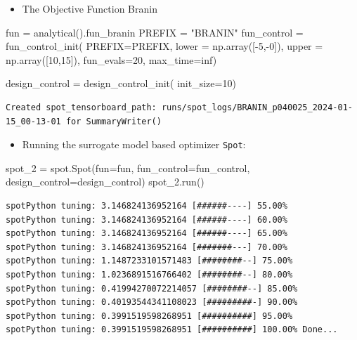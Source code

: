 \documentclass[
  letterpaper,
  DIV=11,
  numbers=noendperiod]{scrreprt}
\newenvironment{Shaded}{\begin{snugshade}}{\end{snugshade}}
\newcommand{\DecValTok}[1]{\textcolor[rgb]{0.68,0.00,0.00}{#1}}
\newcommand{\NormalTok}[1]{\textcolor[rgb]{0.00,0.23,0.31}{#1}}
\newcommand{\OperatorTok}[1]{\textcolor[rgb]{0.37,0.37,0.37}{#1}}
\newcommand{\StringTok}[1]{\textcolor[rgb]{0.13,0.47,0.30}{#1}}
\providecommand{\tightlist}{%
  \setlength{\itemsep}{0pt}\setlength{\parskip}{0pt}}\usepackage{longtable,booktabs,array}
\begin{document}
\begin{itemize}
\tightlist
\item
  The Objective Function Branin
\end{itemize}

\begin{Shaded}
\begin{Highlighting}[]
\NormalTok{fun }\OperatorTok{=}\NormalTok{ analytical().fun\_branin}
\NormalTok{PREFIX }\OperatorTok{=} \StringTok{"BRANIN"}
\NormalTok{fun\_control }\OperatorTok{=}\NormalTok{ fun\_control\_init(}
\NormalTok{    PREFIX}\OperatorTok{=}\NormalTok{PREFIX,}
\NormalTok{    lower }\OperatorTok{=}\NormalTok{ np.array([}\OperatorTok{{-}}\DecValTok{5}\NormalTok{,}\OperatorTok{{-}}\DecValTok{0}\NormalTok{]),}
\NormalTok{    upper }\OperatorTok{=}\NormalTok{ np.array([}\DecValTok{10}\NormalTok{,}\DecValTok{15}\NormalTok{]),}
\NormalTok{    fun\_evals}\OperatorTok{=}\DecValTok{20}\NormalTok{,}
\NormalTok{    max\_time}\OperatorTok{=}\NormalTok{inf)}

\NormalTok{design\_control }\OperatorTok{=}\NormalTok{ design\_control\_init(}
\NormalTok{    init\_size}\OperatorTok{=}\DecValTok{10}\NormalTok{)}
\end{Highlighting}
\end{Shaded}

\begin{verbatim}
Created spot_tensorboard_path: runs/spot_logs/BRANIN_p040025_2024-01-15_00-13-01 for SummaryWriter()
\end{verbatim}

\begin{itemize}
\tightlist
\item
  Running the surrogate model based optimizer \texttt{Spot}:
\end{itemize}

\begin{Shaded}
\begin{Highlighting}[]
\NormalTok{spot\_2 }\OperatorTok{=}\NormalTok{ spot.Spot(fun}\OperatorTok{=}\NormalTok{fun,}
\NormalTok{                   fun\_control}\OperatorTok{=}\NormalTok{fun\_control,}
\NormalTok{                   design\_control}\OperatorTok{=}\NormalTok{design\_control)}
\NormalTok{spot\_2.run()}
\end{Highlighting}
\end{Shaded}

\begin{verbatim}
spotPython tuning: 3.146824136952164 [######----] 55.00% 
spotPython tuning: 3.146824136952164 [######----] 60.00% 
spotPython tuning: 3.146824136952164 [######----] 65.00% 
spotPython tuning: 3.146824136952164 [#######---] 70.00% 
spotPython tuning: 1.1487233101571483 [########--] 75.00% 
spotPython tuning: 1.0236891516766402 [########--] 80.00% 
spotPython tuning: 0.41994270072214057 [########--] 85.00% 
spotPython tuning: 0.40193544341108023 [#########-] 90.00% 
spotPython tuning: 0.3991519598268951 [##########] 95.00% 
spotPython tuning: 0.3991519598268951 [##########] 100.00% Done...
\end{verbatim}
\end{document}
